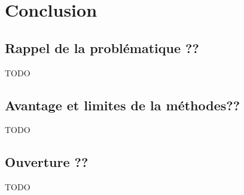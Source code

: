 \chapter*{Conclusion}
    \label{chapter:CONCLUSION}

    \section{Rappel de la problématique ??}

    TODO

    \section{Avantage et limites de la méthodes??}

    TODO

    \section{Ouverture ??}

    TODO